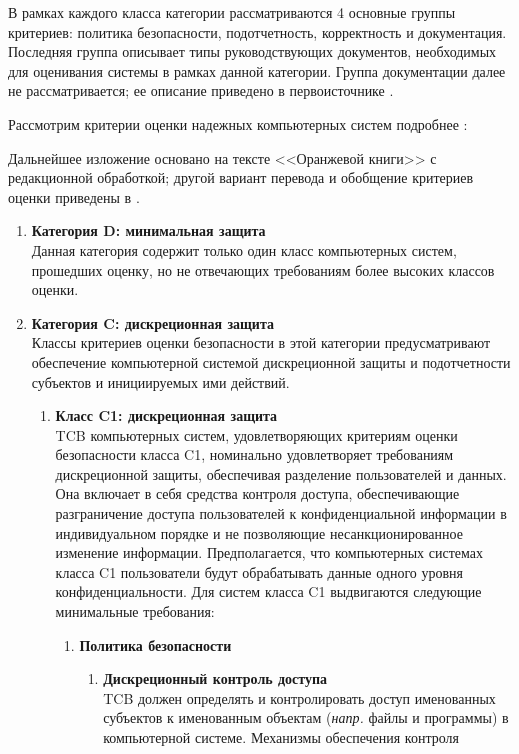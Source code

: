В рамках каждого класса категории рассматриваются 4 основные группы критериев: политика безопасности, подотчетность, корректность и документация. Последняя группа описывает типы руководствующих
документов, необходимых для оценивания системы в рамках данной категории. Группа документации далее не рассматривается; ее описание приведено в первоисточнике \cite{OrangeBook}.

Рассмотрим критерии оценки надежных компьютерных систем подробнее \cite[Part 1]{OrangeBook}:

Дальнейшее изложение основано на тексте <<Оранжевой книги>> с редакционной обработкой; другой вариант перевода и обобщение критериев оценки приведены в \cite{OrangeBookTranslation}.

\begin{enumerate}
	\item{\textbf{Категория D: минимальная защита}}\\
	Данная категория содержит только один класс компьютерных систем, прошедших оценку, но не отвечающих требованиям более высоких классов оценки.
	\item{\textbf{Категория C: дискреционная защита}}\\
	Классы критериев оценки безопасности в этой категории предусматривают обеспечение компьютерной системой дискреционной защиты и подотчетности субъектов и инициируемых ими действий.
	\begin{enumerate}
		\item{\textbf{Класс C1: дискреционная защита}}\\
		TCB компьютерных систем, удовлетворяющих критериям оценки безопасности класса C1, номинально удовлетворяет требованиям дискреционной защиты, обеспечивая разделение пользователей и данных.
		Она включает в себя средства контроля доступа, обеспечивающие разграничение доступа пользователей к конфиденциальной информации в индивидуальном порядке и не позволяющие несанкционированное
		изменение информации. Предполагается, что компьютерных системах класса C1 пользователи будут обрабатывать данные одного уровня конфиденциальности. Для систем класса C1 выдвигаются следующие
		минимальные требования:
		\begin{enumerate}
			\item{\textbf{Политика безопасности}}
			\begin{enumerate}
				\item{\textbf{Дискреционный контроль доступа}}\\
				TCB должен определять и контролировать доступ именованных субъектов к именованным объектам (\textit{напр.} файлы и программы) в компьютерной системе. Механизмы обеспечения контроля

\end{enumerate}
\end{enumerate}
\end{enumerate}
\end{enumerate}
